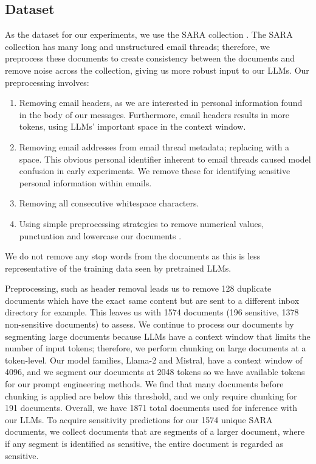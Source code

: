 \subsection{Dataset}
As the dataset for our experiments, we use the SARA collection \cite{mckechnie2024sara}. The SARA collection has many long and unstructured email threads; therefore, we preprocess these documents to create consistency between the documents and remove noise across the collection, giving us more robust input to our LLMs. Our preprocessing involves:
\begin{enumerate}
    \item Removing email headers, as we are interested in personal information found in the body of our messages. Furthermore, email headers results in more tokens, using LLMs' important space in the context window.
    \item Removing email addresses from email thread metadata; replacing {\em@} with a space. This obvious personal identifier inherent to email threads caused model confusion in early experiments. We remove these for identifying sensitive personal information within emails.
    \item Removing all consecutive whitespace characters.
    \item Using simple preprocessing strategies to remove numerical values, punctuation and lowercase our documents \cite{rehurek2011gensim}.
\end{enumerate}

We do not remove any stop words from the documents as this is less representative of the training data seen by pretrained LLMs.

Preprocessing, such as header removal leads us to remove 128 duplicate documents which have the exact same content but are sent to a different inbox directory for example. This leaves us with 1574 documents (196 sensitive, 1378 non-sensitive documents) to assess. We continue to process our documents by segmenting large documents because LLMs have a context window that limits the number of input tokens; therefore, we perform chunking on large documents at a token-level. Our model families, Llama-2 and Mistral, have a context window of 4096, and we segment our documents at 2048 tokens so we have available tokens for our prompt engineering methods. We find that many documents before chunking is applied are below this threshold, and we only require chunking for 191 documents. Overall, we have 1871 total documents used for inference with our LLMs. To acquire sensitivity predictions for our 1574 unique SARA documents, we collect documents that are segments of a larger document, where if any segment is identified as sensitive, the entire document is regarded as sensitive.

